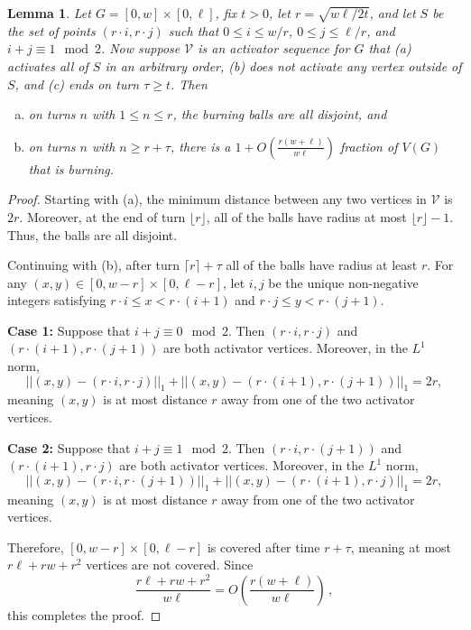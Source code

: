 \documentclass[12pt]{article}
\newtheorem{lemma}[theorem]{Lemma}
\theoremstyle{remark}
\newcommand\cV{\mathcal V}
\begin{document}
\begin{lemma}\label{lem:rectangle strategy}
Let $G = [0, w] \times [0, \ell]$, fix $t > 0$, let $r = \sqrt{w \ell/2t}$, and let $S$ be the set of points $(r \cdot i, r \cdot j)$ such that $0 \leq i \leq w/r$, $0 \leq j \leq \ell/r$, and $i+j \equiv 1 \mod 2$. Now suppose $\cV$ is an activator sequence for $G$ that (a) activates all of $S$ in an arbitrary order, (b) does not activate any vertex outside of $S$, and (c) ends on turn $\tau \geq t$. Then 
\begin{enumerate}[(a)]
\item on turns $n$ with $1 \leq n \leq r$, the burning balls are all disjoint, and 
\item on turns $n$ with $n \geq r+\tau$, there is a $1+O\left( \frac{r(w+\ell)}{w\ell} \right)$ fraction of $V(G)$ that is burning. 
\end{enumerate}
\end{lemma}

\begin{proof}
Starting with (a), the minimum distance between any two vertices in $\cV$ is $2r$. Moreover, at the end of turn $\lfloor r \rfloor$, all of the balls have radius at most $\lfloor r \rfloor - 1$. Thus, the balls are all disjoint. 

Continuing with (b), after turn $\lceil r \rceil + \tau$ all of the balls have radius at least $r$. For any $(x, y) \in [0, w-r] \times [0, \ell-r]$, let $i, j$ be the unique non-negative integers satisfying $r \cdot i \leq x < r \cdot (i+1)$ and $r \cdot j \leq y < r \cdot (j+1)$. 

\bigskip
\noindent
\textbf{Case 1:}
Suppose that $i+j \equiv 0 \mod 2$. Then $(r \cdot i, r \cdot j)$ and $(r \cdot (i+1), r \cdot (j+1))$ are both activator vertices. Moreover, in the $L^1$ norm, 
\[
||(x,y) - (r \cdot i, r \cdot j)||_1 + ||(x,y) - (r \cdot (i+1), r \cdot (j+1))||_1 = 2r, 
\]
meaning $(x, y)$ is at most distance $r$ away from one of the two activator vertices. 

\bigskip
\noindent
\textbf{Case 2:}
Suppose that $i+j \equiv 1 \mod 2$. Then $(r \cdot i, r \cdot (j+1))$ and $(r \cdot (i+1), r \cdot j)$ are both activator vertices. Moreover, in the $L^1$ norm, 
\[
||(x,y) - (r \cdot i, r \cdot (j+1))||_1 + ||(x,y) - (r \cdot (i+1), r \cdot j)||_1 = 2r, 
\]
meaning $(x, y)$ is at most distance $r$ away from one of the two activator vertices. 

Therefore, $[0, w-r] \times [0, \ell-r]$ is covered after time $r + \tau$, meaning at most $r \ell + r w + r^2$ vertices are not covered. Since 
\[
\frac{r \ell + r w + r^2}{w\ell} = O\left(\frac{r(w+\ell)}{w\ell}\right) \,,
\]
this completes the proof.
\end{proof}
\end{document}
